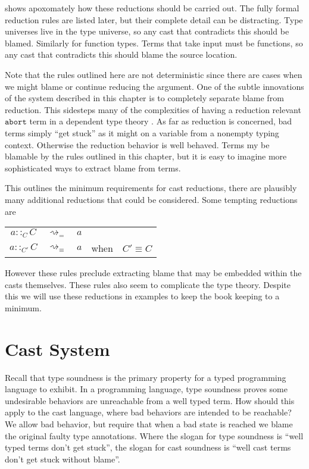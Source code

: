  shows apoxomately how these reductions should be carried out.
The fully formal reduction rules are listed later, but their complete detail can be distracting.
Type universes live in the type universe, so any cast that contradicts this should be blamed.
Similarly for function types.
Terms that take input must be functions, so any cast that contradicts this should blame the source location.

Note that the rules outlined here are not deterministic since there are cases when we might blame or continue reducing the argument.
One of the subtle innovations of the system described in this chapter is to completely separate blame from reduction.
This sidesteps many of the complexities of having a reduction relevant $\mathtt{abort}$ term in a dependent type theory \cite{sjoberg2012irrelevance,pedrot2018failure}.
As far as reduction is concerned, bad terms simply ``get stuck'' as it might on a variable from a nonempty typing context.
Otherwise the reduction behavior is well behaved.
Terms my be blamable by the rules outlined in this chapter, but it is easy to imagine more sophisticated ways to extract blame from terms. 

This outlines the minimum requirements for cast reductions, there are plausibly many additional reductions that could be considered.
Some tempting reductions are

\begin{tabular}{ccccc}
$a::_{C}C$ & $\rightsquigarrow_{=}$ & $a$ &  & \tabularnewline
$a::_{C'}C$ & $\rightsquigarrow_{\equiv}$ & $a$ & when & $C'\equiv C$\tabularnewline
\end{tabular}

However these rules preclude extracting blame that may be embedded within the casts themselves.
These rules also seem to complicate the type theory.
Despite this we will use these reductions in examples to keep the book keeping to a minimum.




\section{Cast System}


Recall that type soundness is the primary property for a typed programming
language to exhibit. In a programming language, type soundness proves
some undesirable behaviors are unreachable from a well typed term.
How should this apply to the cast language, where bad behaviors are
intended to be reachable? We allow bad behavior, but require that
when a bad state is reached we blame the original faulty type annotations.
Where the slogan for type soundness is ``well typed terms don't get
stuck'', the slogan for cast soundness is ``well cast terms don't
get stuck without blame''.

